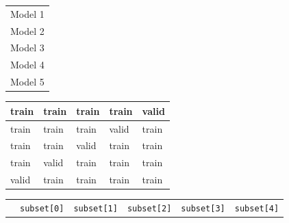 \documentclass[smaller]{beamer}
\theoremstyle{example}
\newcommand{\ttt}[1]{{\small\texttt{#1}}}
\begin{document}
\begin{frame}[fragile]
\begin{center}
    \renewcommand{\arraystretch}{1.2}
    \begin{tabular}{l}
        {\footnotesize\color{blue}Model 1} \\ 
        {\footnotesize\color{blue}Model 2} \\
        {\footnotesize\color{blue}Model 3} \\
        {\footnotesize\color{blue}Model 4} \\
        {\footnotesize\color{blue}Model 5}
    \end{tabular}
    \renewcommand{\arraystretch}{1}
    \begin{tabular}{|p{}|p{}|p{}|p{}|p{}|}
        \hline 
        \quad train & \quad train & \quad train & \quad train & \quad valid \\ 
        \hline
        \hline
        \quad train & \quad train & \quad train & \quad valid & \quad train \\ 
        \hline
        \hline
        \quad train & \quad train & \quad valid & \quad train & \quad train \\ 
        \hline
        \hline
        \quad train & \quad valid & \quad train & \quad train & \quad train \\ 
        \hline
        \hline
        \quad valid & \quad train & \quad train & \quad train & \quad train \\
        \hline
    \end{tabular}
\end{center}
{\color{blue}
\begin{center}
    \begin{tabular}{p{}p{}|p{}|p{}|p{}|p{}}
        \phantom{i} & \ttt{subset[0]} & \ttt{subset[1]} & \ttt{subset[2]} & \ttt{subset[3]} & \ttt{subset[4]}
    \end{tabular}
\end{center}
}

\end{frame}
\end{document}
